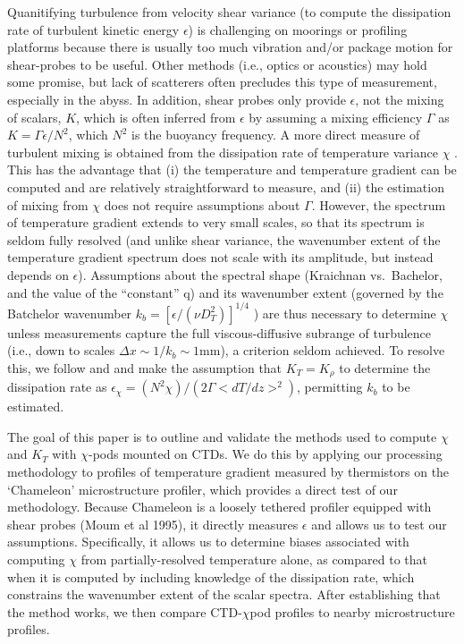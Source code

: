 \documentclass{ametsoc}
\begin{document}
Quanitifying turbulence from velocity shear variance (to compute the dissipation rate of turbulent kinetic energy $\epsilon$) is challenging on moorings or profiling platforms because there is usually too much vibration and/or package motion for shear-probes to be useful. Other methods (i.e., optics or acoustics) may hold some promise, but lack of scatterers often precludes this type of measurement, especially in the abyss.  In addition, shear probes only provide $\epsilon$, not the mixing of scalars, $K$, which is often inferred from $\epsilon$ by assuming a mixing efficiency $\Gamma$ \citep{osborn80} as $K=\Gamma \epsilon / N^{2}$, which $N^2$ is the buoyancy frequency.  A more direct measure of turbulent mixing is obtained from the dissipation rate of temperature variance $\chi$ \citep{osborncox72}.  This has the advantage that (i) the temperature and temperature gradient can be computed and are relatively straightforward to measure, and (ii) the estimation of mixing from $\chi$ does not require assumptions about $\Gamma$. However, the spectrum of temperature gradient extends to very small scales, so that its spectrum is seldom fully resolved (and unlike shear variance, the wavenumber extent of the temperature gradient spectrum does not scale with its amplitude, but instead depends on $\epsilon$). Assumptions about the spectral shape (Kraichnan vs.\ Bachelor, and the value of the ``constant'' q) and its wavenumber extent (governed by the Batchelor wavenumber $k_b=[\epsilon/(\nu D_{T}^{2})]^{1/4}$  \citep{Batchelor59}) are thus necessary to determine $\chi$ unless measurements capture the full viscous-diffusive subrange of turbulence (i.e., down to scales $\Delta x \sim 1/k_b \sim 1$mm), a criterion seldom achieved.  To resolve this, we follow \cite{alfordpinkel00b} and \cite{moumnash09} and make the assumption that $K_T=K_{\rho}$ to determine the dissipation rate as $\epsilon_{\chi}=(N^2\chi)/(2\Gamma <dT/dz>^2)$, permitting $k_b$ to be estimated. 


The goal of this paper is to outline and validate the methods used to compute $\chi$ and $K_T$ with $\chi$-pods mounted on CTDs.  We do this by applying our processing methodology to profiles of temperature gradient measured by thermistors on the `Chameleon' microstructure profiler, which provides a direct test of our methodology.  Because Chameleon is a loosely tethered profiler equipped with shear probes (Moum et al 1995), it directly measures $\epsilon$ and allows us to test our assumptions.  Specifically, it allows us to determine biases associated with computing $\chi$ from partially-resolved temperature alone, as compared to that when it is computed by including knowledge of the dissipation rate, which constrains the wavenumber extent of the scalar spectra.   After establishing that the method works, we then compare CTD-$\chi$pod profiles to nearby microstructure profiles.
\end{document}
